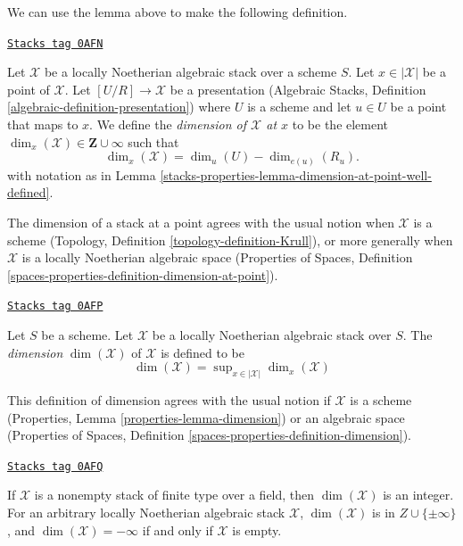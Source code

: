 We can use the lemma above to make the following definition.

\begin{definition}
\label{stacks-properties-definition-dimension-at-point}
\href{https://stacks.math.columbia.edu/tag/0AFN}{\texttt{Stacks tag 0AFN}}

Let $\mathcal{X}$ be a locally Noetherian algebraic stack over a scheme $S$.
Let $x \in |\mathcal{X}|$ be a point of $\mathcal{X}$.
Let $[U/R] \to \mathcal{X}$ be a presentation
(Algebraic Stacks, Definition \ref{algebraic-definition-presentation})
where $U$ is a scheme
and let $u \in U$ be a point that maps to $x$.
We define the {\it dimension of $\mathcal{X}$ at $x$} to be
the element $\dim_x(\mathcal{X}) \in \mathbf{Z} \cup \infty$
such that
$$
\dim_x(\mathcal{X}) = \dim_u(U)-\dim_{e(u)}(R_u).
$$
with notation as in Lemma \ref{stacks-properties-lemma-dimension-at-point-well-defined}.
\end{definition}

The dimension of a stack at a point agrees with the usual notion
when $\mathcal{X}$ is a scheme (Topology, Definition
\ref{topology-definition-Krull}),
or more generally when $\mathcal{X}$ is a locally Noetherian algebraic space
(Properties of Spaces, Definition
\ref{spaces-properties-definition-dimension-at-point}).

\begin{definition}[Dimension]
\label{stacks-properties-definition-dimension}
\href{https://stacks.math.columbia.edu/tag/0AFP}{\texttt{Stacks tag 0AFP}}

Let $S$ be a scheme. Let $\mathcal{X}$ be
a locally Noetherian algebraic stack over $S$.
The {\it dimension} $\dim(\mathcal{X})$ of $\mathcal{X}$ is defined to be
$$
\dim(\mathcal{X}) = \sup\nolimits_{x \in |\mathcal{X}|} \dim_x(\mathcal{X})
$$
\end{definition}

This definition of dimension agrees with the usual notion
if $\mathcal{X}$ is a scheme
(Properties, Lemma \ref{properties-lemma-dimension})
or an algebraic space (Properties of Spaces, Definition
\ref{spaces-properties-definition-dimension}).

\begin{remark}
\label{stacks-properties-remark-dimension-empty-stack}
\href{https://stacks.math.columbia.edu/tag/0AFQ}{\texttt{Stacks tag 0AFQ}}

If $\mathcal{X}$ is a nonempty stack of finite type over a field,
then $\dim(\mathcal{X})$ is an integer. For an arbitrary
locally Noetherian algebraic stack $\mathcal{X}$,
$\dim(\mathcal{X})$ is in $Z\cup \{\pm \infty\}$,
and $\dim(\mathcal{X}) = -\infty$ if and only if $\mathcal{X}$
is empty.
\end{remark}

